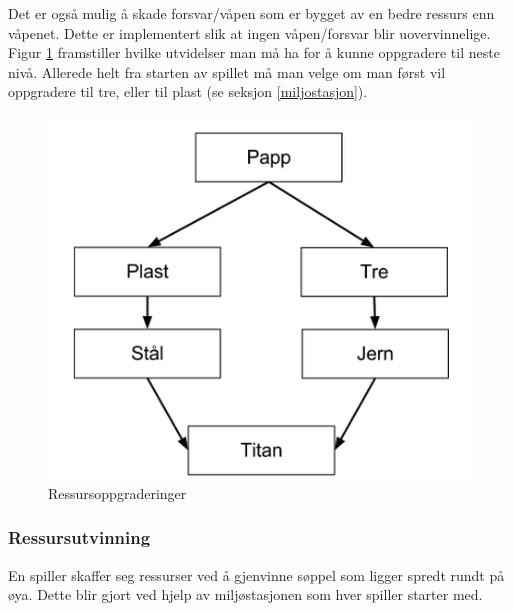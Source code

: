 Det er også mulig å skade forsvar/våpen som er bygget av en bedre ressurs enn våpenet. Dette er implementert slik at ingen våpen/forsvar blir uovervinnelige. Figur \ref{fig:ressursoppgraderinger} framstiller hvilke utvidelser man må ha for å kunne oppgradere til neste nivå. Allerede helt fra starten av spillet må man velge om man først vil oppgradere til tre, eller til plast (se seksjon \ref{miljostasjon}). 

	\begin{figure} [H]
				\begin{center}
					\includegraphics[scale=0.5]{images/oppgraderingstre}
				\end{center}
			\caption{Ressursoppgraderinger}
			\label{fig:ressursoppgraderinger}
	\end{figure}

\subsubsection{Ressursutvinning}
En spiller skaffer seg ressurser ved å gjenvinne søppel som ligger
spredt rundt på øya. Dette blir gjort ved hjelp av miljøstasjonen
som hver spiller starter med.
